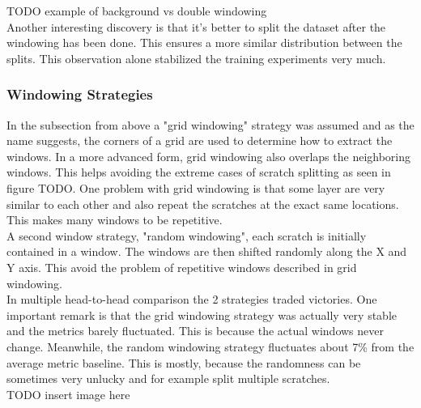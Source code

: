 TODO example of background vs double windowing \\

Another interesting discovery is that it's better to split the dataset after the windowing has been done. This ensures a more similar distribution between the splits. This observation alone stabilized the training experiments very much. \\




\subsubsection{Windowing Strategies}
In the subsection from above a "grid windowing" strategy was assumed and as the name suggests, the corners of a grid are used to determine how to extract the windows. In a more advanced form, grid windowing also overlaps the neighboring windows. This helps avoiding the extreme cases of scratch splitting as seen in figure TODO. One problem with grid windowing is that some layer are very similar to each other and also repeat the scratches at the exact same locations. This makes many windows to be repetitive.\\
A second window strategy, "random windowing", each scratch is initially contained in a window. The windows are then shifted randomly along the X and Y axis. This avoid the problem of repetitive windows described in grid windowing. \\
In multiple head-to-head comparison the 2 strategies traded victories. One important remark is that the grid windowing strategy was actually very stable and the metrics barely fluctuated. This is because the actual windows never change. Meanwhile, the random windowing strategy fluctuates about 7\% from the average metric baseline. This is mostly, because the randomness can be sometimes very unlucky and for example split multiple scratches. \\

TODO insert image here \\

